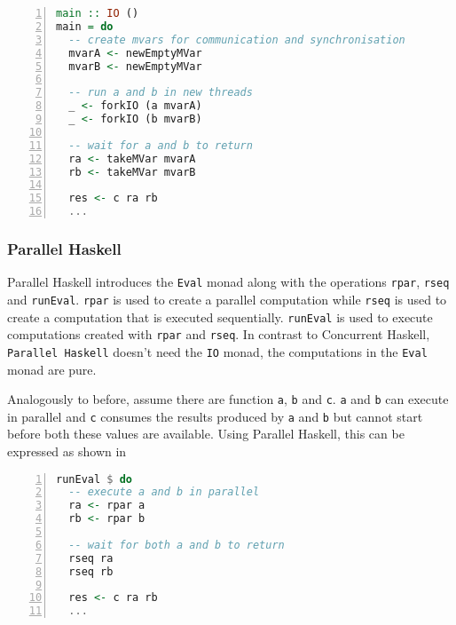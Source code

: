 \begin{lstlisting}[language=Haskell, numbers=left, frame=bt, label=lst:example_concurrent_haskell, caption={Parallel and sequential composition in \textsf{Concurrent Haskell}.}]
main :: IO ()
main = do
  -- create mvars for communication and synchronisation
  mvarA <- newEmptyMVar
  mvarB <- newEmptyMVar  
  
  -- run a and b in new threads
  _ <- forkIO (a mvarA)
  _ <- forkIO (b mvarB)  
  
  -- wait for a and b to return
  ra <- takeMVar mvarA
  rb <- takeMVar mvarB
  
  res <- c ra rb
  ...
\end{lstlisting}

\subsubsection{Parallel Haskell}
\textsf{Parallel Haskell} introduces the \texttt{Eval} monad along with the operations \texttt{rpar}, \texttt{rseq} and \texttt{runEval}. \texttt{rpar} is used to create a parallel computation while \texttt{rseq} is used to create a computation that is executed sequentially. \texttt{runEval} is used to execute computations created with \texttt{rpar} and \texttt{rseq}. In contrast to \textsf{Concurrent Haskell}, \texttt{Parallel Haskell} doesn't need the \texttt{IO} monad, the computations in the \texttt{Eval} monad are pure.

Analogously to before, assume there are function \texttt{a}, \texttt{b} and \texttt{c}. \texttt{a} and \texttt{b} can execute in parallel and \texttt{c} consumes the results produced by \texttt{a} and \texttt{b} but cannot start before both these values are available. Using \textsf{Parallel Haskell}, this can be expressed as shown in 
\begin{lstlisting}[language=Haskell, numbers=left, frame=bt, label=lst:example_parallel_haskell, caption={Parallel and sequential composition in \textsf{Parallel Haskell}.}]
runEval $ do
  -- execute a and b in parallel
  ra <- rpar a
  rb <- rpar b
  
  -- wait for both a and b to return
  rseq ra
  rseq rb
  
  res <- c ra rb
  ...
\end{lstlisting}